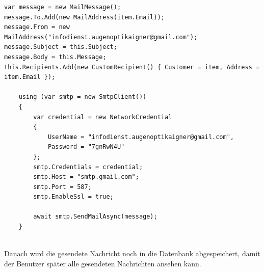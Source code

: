 \begin{lstlisting}
var message = new MailMessage();
message.To.Add(new MailAddress(item.Email));
message.From = new MailAddress("infodienst.augenoptikaigner@gmail.com");
message.Subject = this.Subject;
message.Body = this.Message;
this.Recipients.Add(new CustomRecipient() { Customer = item, Address = item.Email });

	using (var smtp = new SmtpClient())
    {
    	var credential = new NetworkCredential
		{
        	UserName = "infodienst.augenoptikaigner@gmail.com",
            Password = "7gnRwN4U"
        };
        smtp.Credentials = credential;
        smtp.Host = "smtp.gmail.com";
        smtp.Port = 587;
        smtp.EnableSsl = true;

        await smtp.SendMailAsync(message);
    }
        
\end{lstlisting}
\bigskip
Danach wird die gesendete Nachricht noch in die Datenbank abgespeichert, damit der Benutzer später alle gesendeten Nachrichten ansehen kann.

